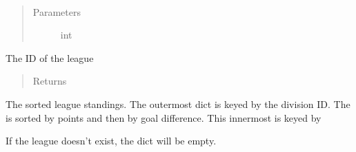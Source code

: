 \documentclass[letterpaper,10pt,english]{sphinxmanual}
\begin{document}
\begin{fulllineitems}
\label{\detokenize{tiger_leagues/models/readme:tiger_leagues.models.league_model.get_league_standings}}~\begin{quote}\begin{description}
\item[{Parameters}] \leavevmode
{} \textendash{} int

\end{description}\end{quote}

The ID of the league
\begin{quote}\begin{description}
\item[{Returns}] \leavevmode
{}

\end{description}\end{quote}

The sorted league standings. The outermost dict is keyed by the division ID. 
The  is sorted by points and then by goal difference. This 
innermost is keyed by 

If the league doesn’t exist, the dict will be empty.

\end{fulllineitems}

\end{document}
